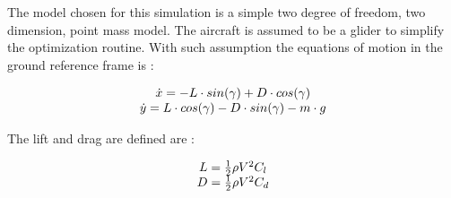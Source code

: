 

\par The model chosen for this simulation is a simple two degree of freedom, two dimension, point mass model. 
The aircraft is assumed to be a glider to simplify the optimization routine. 
With such assumption the equations of motion in the ground reference frame is :

\begin{equation}
	\begin{array}[c]{c}
		\dot{x}= -L \cdot sin(\gamma) + D \cdot cos(\gamma) \\ 
		\dot{y}= L \cdot cos(\gamma) - D \cdot sin(\gamma) - m \cdot g
	\end{array}
	\label{eqn:eqm}
\end{equation}


\par The lift and drag are defined are :

\begin{equation}
	\begin{array}[c]{c}
		L= \frac{1}{2} \rho V^2 C_l \\ 
		D= \frac{1}{2} \rho V^2 C_d
	\end{array}
	\label{eqn:Cl_def}
\end{equation}










